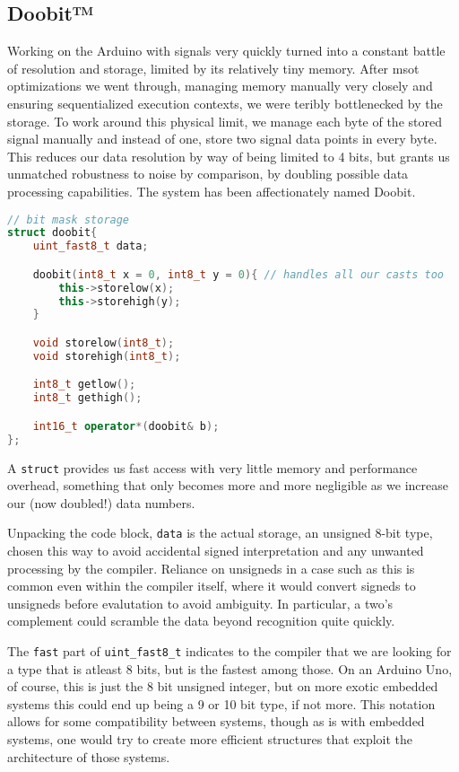 \subsection{Doobit™}

Working on the Arduino with signals very quickly turned into a constant battle
of resolution and storage, limited by its relatively tiny memory. After msot
optimizations we went through, managing memory manually very closely and
ensuring sequentialized execution contexts, we were teribly bottlenecked by the
storage. To work around this physical limit, we manage each byte of the stored
signal manually and instead of one, store two signal data points in every byte.
This reduces our data resolution by way of being limited to 4 bits, but grants
us unmatched robustness to noise by comparison, by doubling possible data
processing capabilities. The system has been affectionately named Doobit.

\begin{lstlisting}[language=C++]
// bit mask storage
struct doobit{
    uint_fast8_t data;

    doobit(int8_t x = 0, int8_t y = 0){ // handles all our casts too
        this->storelow(x);
        this->storehigh(y);
    }

    void storelow(int8_t);
    void storehigh(int8_t);

    int8_t getlow();
    int8_t gethigh();

    int16_t operator*(doobit& b);
};
\end{lstlisting}

A \texttt{struct} provides us fast access with very little memory and
performance overhead, something that only becomes more and more negligible as we
increase our (now doubled!) data numbers.

Unpacking the code block, \texttt{data} is the actual storage, an unsigned 8-bit
type, chosen this way to avoid accidental signed interpretation and any unwanted
processing by the compiler. Reliance on unsigneds in a case such as this is
common even within the compiler itself, where it would convert signeds to
unsigneds before evalutation to avoid ambiguity. In particular, a two's
complement could scramble the data beyond recognition quite quickly.

The \texttt{fast} part of \texttt{uint\_fast8\_t} indicates to the compiler that
we are looking for a type that is atleast 8 bits, but is the fastest among
those. On an Arduino Uno, of course, this is just the 8 bit unsigned integer,
but on more exotic embedded systems this could end up being a 9 or 10 bit type,
if not more. This notation allows for some compatibility between systems, though
as is with embedded systems, one would try to create more efficient structures
that exploit the architecture of those systems.

